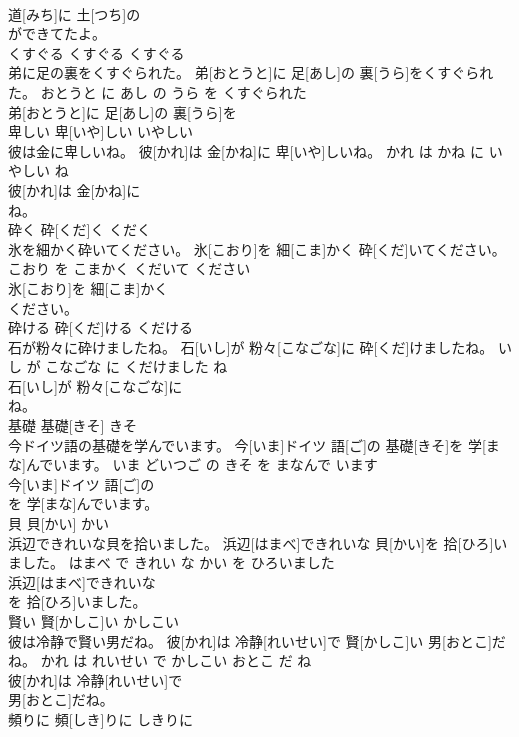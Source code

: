 \documentclass[8pt]{extreport}
\begin{document}
\begin{CJK}{UTF8}{min}
\\	道[みち]に 土[つち]の
\\	ができてたよ。			
\\	くすぐる	くすぐる	くすぐる	
\\	弟に足の裏をくすぐられた。	弟[おとうと]に 足[あし]の 裏[うら]をくすぐられた。	おとうと に あし の うら を くすぐられた	
\\	弟[おとうと]に 足[あし]の 裏[うら]を
\\	卑しい	卑[いや]しい	いやしい	
\\	彼は金に卑しいね。	彼[かれ]は 金[かね]に 卑[いや]しいね。	かれ は かね に いやしい ね	
\\	彼[かれ]は 金[かね]に
\\	ね。			
\\	砕く	砕[くだ]く	くだく	
\\	氷を細かく砕いてください。	氷[こおり]を 細[こま]かく 砕[くだ]いてください。	こおり を こまかく くだいて ください	
\\	氷[こおり]を 細[こま]かく
\\	ください。			
\\	砕ける	砕[くだ]ける	くだける	
\\	石が粉々に砕けましたね。	石[いし]が 粉々[こなごな]に 砕[くだ]けましたね。	いし が こなごな に くだけました ね	
\\	石[いし]が 粉々[こなごな]に
\\	ね。			
\\	基礎	基礎[きそ]	きそ	
\\	今ドイツ語の基礎を学んでいます。	今[いま]ドイツ 語[ご]の 基礎[きそ]を 学[まな]んでいます。	いま どいつご の きそ を まなんで います	
\\	今[いま]ドイツ 語[ご]の
\\	を 学[まな]んでいます。			
\\	貝	貝[かい]	かい	
\\	浜辺できれいな貝を拾いました。	浜辺[はまべ]できれいな 貝[かい]を 拾[ひろ]いました。	はまべ で きれい な かい を ひろいました	
\\	浜辺[はまべ]できれいな
\\	を 拾[ひろ]いました。			
\\	賢い	賢[かしこ]い	かしこい	
\\	彼は冷静で賢い男だね。	彼[かれ]は 冷静[れいせい]で 賢[かしこ]い 男[おとこ]だね。	かれ は れいせい で かしこい おとこ だ ね	
\\	彼[かれ]は 冷静[れいせい]で
\\	男[おとこ]だね。			
\\	頻りに	頻[しき]りに	しきりに	

\end{CJK}
\end{document}
